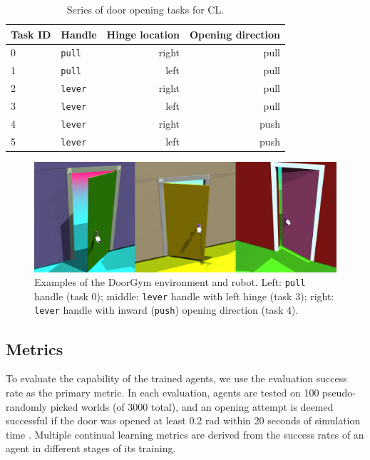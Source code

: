 \documentclass[dvipsnames]{article} %
\begin{document}
\begin{table}[b]
\caption{Series of door opening tasks for CL.}
\label{tab:tasksequence}
\begin{center}
\begin{tabular}{@{}llrr@{}}
\toprule
Task ID & Handle & Hinge location & Opening direction \\ 
\midrule
0 & \texttt{pull}  & right & pull \\
1 & \texttt{pull}  & left  & pull \\
2 & \texttt{lever} & right & pull \\
3 & \texttt{lever} & left  & pull \\
4 & \texttt{lever} & right & push \\
5 & \texttt{lever} & left  & push \\
\bottomrule
\end{tabular}
\end{center}
\end{table}

\begin{figure}[htbp]
\begin{center}
\includegraphics[width=1.0\linewidth]{images/3doors.png}
\end{center}
\caption{Examples of the DoorGym environment and robot. Left: \texttt{pull} handle (task 0); middle: \texttt{lever} handle with left hinge (task 3); right: \texttt{lever} handle with inward (\texttt{push}) opening direction (task 4).}
\label{fig:door-examples}
\end{figure}


\subsection{Metrics}
\label{chap:metrics}
To evaluate the capability of the trained agents, we use the evaluation success rate as the primary metric. In each evaluation, agents are tested on 100 pseudo-randomly picked worlds (of 3000 total), and an opening attempt is deemed successful if the door was opened at least 0.2 rad within 20 seconds of simulation time \citep{doorgym}. Multiple continual learning metrics are derived from the success rates of an agent in different stages of its training.
\end{document}
